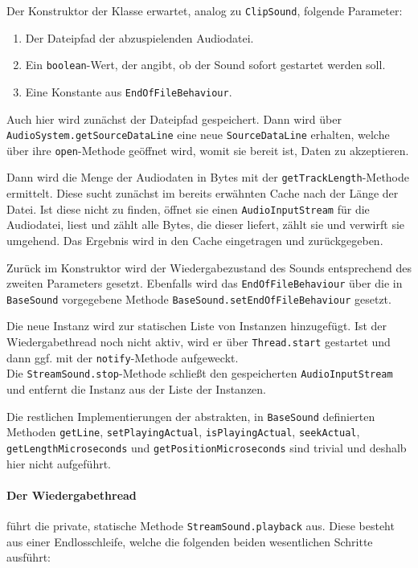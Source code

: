 \begin{sloppypar}
Der Konstruktor der Klasse erwartet, analog zu \texttt{ClipSound},
folgende Parameter:

\begin{enumerate}
	\item Der Dateipfad der abzuspielenden Audiodatei.
	\item Ein \texttt{boolean}-Wert, der angibt, ob der
	      Sound sofort gestartet werden soll.
	\item Eine Konstante aus \texttt{EndOfFileBehaviour}.
\end{enumerate}

Auch hier wird zunächst der Dateipfad gespeichert. Dann wird über
\texttt{AudioSystem.getSourceDataLine} eine neue \texttt{SourceDataLine}
erhalten, welche über ihre \texttt{open}-Methode geöffnet wird,
womit sie bereit ist, Daten zu akzeptieren.

Dann wird die Menge der Audiodaten in Bytes mit der \texttt{getTrackLength}-Methode
ermittelt. Diese sucht zunächst im bereits erwähnten Cache nach der Länge der
Datei. Ist diese nicht zu finden, öffnet sie einen \texttt{AudioInputStream} für
die Audiodatei, liest und zählt alle Bytes, die dieser liefert, zählt
sie und verwirft sie umgehend. Das Ergebnis wird in den Cache eingetragen und
zurückgegeben.

Zurück im Konstruktor wird der Wiedergabezustand des Sounds
entsprechend des zweiten Parameters gesetzt. Ebenfalls wird
das \texttt{EndOfFileBehaviour} über die in \texttt{BaseSound}
vorgegebene Methode \texttt{BaseSound.setEndOfFileBehaviour}
gesetzt.

Die neue Instanz wird zur statischen Liste von Instanzen hinzugefügt.
Ist der Wiedergabethread noch nicht aktiv, wird er über
\texttt{Thread.start} gestartet und dann ggf. mit der
\texttt{notify}-Methode aufgeweckt.
\\

Die \texttt{StreamSound.stop}-Methode schließt den gespeicherten
\texttt{AudioInputStream} und entfernt die Instanz aus der Liste
der Instanzen.

Die restlichen Implementierungen der abstrakten, in \texttt{BaseSound}
definierten Methoden \texttt{getLine}, \texttt{setPlayingActual},
\texttt{isPlayingActual}, \texttt{seekActual}, \texttt{getLengthMicroseconds}
und \texttt{getPositionMicroseconds} sind trivial und deshalb hier nicht aufgeführt.

\paragraph{Der Wiedergabethread} führt die private, statische Methode
\texttt{StreamSound.playback} aus. Diese besteht aus einer Endlosschleife,
welche die folgenden beiden wesentlichen Schritte ausführt:


\end{sloppypar}
